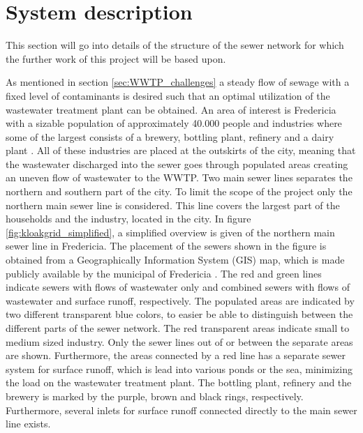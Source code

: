 \chapter{System description}\label{se:system_description}
This section will go into details of the structure of the sewer network for which the further work of this project will be based upon.

As mentioned in section \ref{sec:WWTP_challenges} a steady flow of sewage with a fixed level of contaminants is desired such that an optimal utilization of the wastewater treatment plant can be obtained. An area of interest is Fredericia with a sizable population of approximately 40.000 people and industries where some of the largest consists of a brewery, bottling plant, refinery and a dairy plant \cite{Statistic_Denmark}. All of these industries are placed at the outskirts of the city, meaning that the wastewater discharged into the sewer goes through populated areas creating an uneven flow of wastewater to the WWTP. Two main sewer lines separates the northern and southern part of the city. To limit the scope of the project only the northern main sewer line is considered. This line covers the largest part of the households and the industry, located in the city. %
In figure \ref{fig:kloakgrid_simplified}, a simplified overview is given of the northern main sewer line in Fredericia. The placement of the sewers shown in the figure is obtained from a Geographically Information System (GIS) map, which is made publicly available by the municipal of Fredericia \cite{GIS_kort}. The red and green lines indicate sewers with flows of wastewater only and combined sewers with flows of wastewater and surface runoff, respectively. The populated areas are indicated by two different transparent blue colors, to easier be able to distinguish between the different parts of the sewer network. The red transparent areas indicate small to medium sized industry. 
Only the sewer lines out of or between the separate areas are shown. Furthermore, the areas connected by a red line has a separate sewer system for surface runoff, which is lead into various ponds or the sea, minimizing the load on the wastewater treatment plant.
The bottling plant, refinery and the brewery is marked by the purple, brown and black rings, respectively. Furthermore, several inlets for surface runoff connected directly to the main sewer line exists. %



